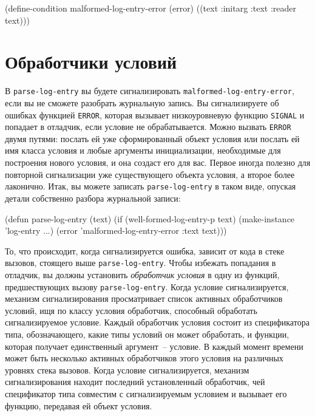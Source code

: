 \begin{myverb}
(define-condition malformed-log-entry-error (error)
  ((text :initarg :text :reader text)))
\end{myverb}

\section{Обработчики условий}

В \lstinline{parse-log-entry} вы будете сигнализировать \lstinline{malformed-log-entry-error}, если
вы не сможете разобрать журнальную запись. Вы сигнализируете об ошибках функцией
\lstinline{ERROR}, которая вызывает низкоуровневую функцию \lstinline{SIGNAL} и попадает в отладчик,
если условие не обрабатывается. Можно вызвать \lstinline{ERROR} двумя путями: послать ей уже
сформированный объект условия или послать ей имя класса условия и любые аргументы
инициализации, необходимые для построения нового условия, и она создаст его для вас.
Первое иногда полезно для повторной сигнализации уже существующего объекта условия, а
второе более лаконично. Итак, вы можете записать \lstinline{parse-log-entry} в таком виде,
опуская детали собственно разбора журнальной записи:

\begin{myverb}
(defun parse-log-entry (text)
  (if (well-formed-log-entry-p text)
    (make-instance 'log-entry ...)
    (error 'malformed-log-entry-error :text text)))
\end{myverb}

То, что происходит, когда сигнализируется ошибка, зависит от кода в стеке вызовов,
стоящего выше \lstinline{parse-log-entry}. Чтобы избежать попадания в отладчик, вы должны
установить \textit{обработчик условия} в одну из функций, предшествующих вызову
\lstinline{parse-log-entry}. Когда условие сигнализируется, механизм сигнализирования
просматривает список активных обработчиков условий, ищя по классу условия обработчик,
способный обработать сигнализируемое условие. Каждый обработчик условия состоит из
спецификатора типа, обозначающего, какие типы условий он может обработать, и функции,
которая получает единственный аргумент~-- условие. В каждый момент времени может быть
несколько активных обработчиков этого условия на различных уровнях стека вызовов. Когда
условие сигнализируется, механизм сигнализирования находит последний установленный
обработчик, чей спецификатор типа совместим с сигнализируемым условием и вызывает его
функцию, передавая ей объект условия.

